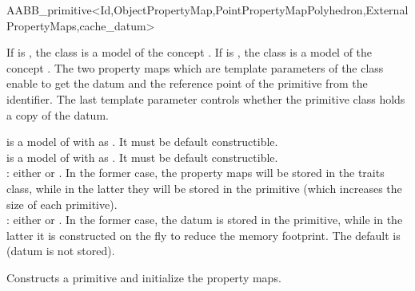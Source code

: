 
\begin{ccRefClass}{AABB_primitive<Id,ObjectPropertyMap,PointPropertyMapPolyhedron,ExternalPropertyMaps,cache_datum>}


\ccDefinition
  
If  is , the class is a model of the concept .
If  is , the class is a model of the concept .
The two property maps which are template parameters of the class enable to get the datum and the reference point of 
the primitive from the identifier. The last template parameter controls whether the primitive class holds a copy of the datum.


\ccParameters
{} is a model of 
with  as . It must be default constructible.\\
 is a model of 
with  as . It must be default constructible.\\
: either  or . In the former case, the property maps will be stored in the traits class, while in the latter they will be stored in the primitive (which increases the size of each primitive).\\
: either  or . In the former case, the datum is stored in the primitive, while in the latter it is constructed on the fly to reduce
the memory footprint. The default is  (datum is not stored).


\ccTypes

\ccGlue
{}
\ccGlue
{}
  
\ccCreation
{}

{Constructs a primitive and initialize the property maps.}
  

\end{ccRefClass}
